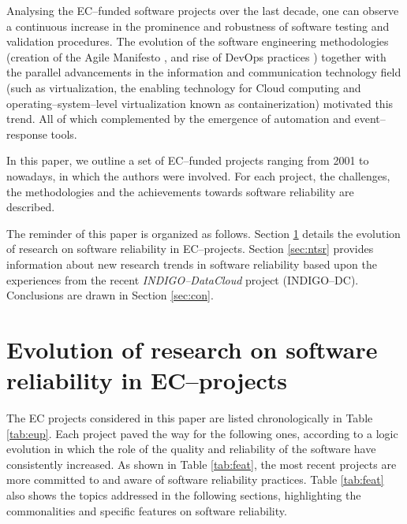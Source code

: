 \documentclass[journal]{IEEEtran}
\begin{document}
Analysing the EC--funded software projects over the last decade,
one can observe a continuous increase in the prominence and robustness of software
testing and validation procedures. The
evolution of the software engineering methodologies (creation of the Agile
Manifesto \cite{agile-manifesto}, and rise of DevOps practices \cite{zhu}) together
with the parallel advancements in the information and communication technology
field (such as virtualization, the enabling technology for Cloud computing and
operating--system--level virtualization known as containerization) motivated this trend. All of which
complemented by the emergence of automation and event--response tools.

In this paper, we outline a set of EC--funded projects
ranging from 2001 to nowadays, in which the authors were involved.
For each project, the challenges, the methodologies and
the achievements towards software reliability are described.

The reminder of this paper is
organized as follows. Section \ref{sec:ev} details the evolution of research on
software reliability in EC--projects. Section \ref{sec:ntsr} provides
information about new research trends in software reliability based upon the
experiences from the recent {\sl INDIGO--DataCloud} project (INDIGO--DC). Conclusions are drawn in Section \ref{sec:con}.

\section{Evolution of research on software reliability in EC--projects}
\label{sec:ev}

The EC projects considered in this paper are listed chronologically in Table
\ref{tab:eup}. Each project paved the way for the following ones, according to a logic evolution in which the role of the quality and reliability of the software have
consistently increased. As shown in Table \ref{tab:feat}, the most recent projects are more committed to and aware of software reliability practices.
Table \ref{tab:feat} also shows the topics addressed in the following sections, highlighting
the commonalities and specific features on software reliability.
\end{document}
